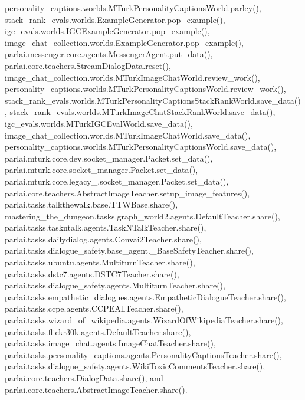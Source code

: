 personality\+\_\+captions.\+worlds.\+M\+Turk\+Personality\+Captions\+World.\+parley(), stack\+\_\+rank\+\_\+evals.\+worlds.\+Example\+Generator.\+pop\+\_\+example(), igc\+\_\+evals.\+worlds.\+I\+G\+C\+Example\+Generator.\+pop\+\_\+example(), image\+\_\+chat\+\_\+collection.\+worlds.\+Example\+Generator.\+pop\+\_\+example(), parlai.\+messenger.\+core.\+agents.\+Messenger\+Agent.\+put\+\_\+data(), parlai.\+core.\+teachers.\+Stream\+Dialog\+Data.\+reset(), image\+\_\+chat\+\_\+collection.\+worlds.\+M\+Turk\+Image\+Chat\+World.\+review\+\_\+work(), personality\+\_\+captions.\+worlds.\+M\+Turk\+Personality\+Captions\+World.\+review\+\_\+work(), stack\+\_\+rank\+\_\+evals.\+worlds.\+M\+Turk\+Personality\+Captions\+Stack\+Rank\+World.\+save\+\_\+data(), stack\+\_\+rank\+\_\+evals.\+worlds.\+M\+Turk\+Image\+Chat\+Stack\+Rank\+World.\+save\+\_\+data(), igc\+\_\+evals.\+worlds.\+M\+Turk\+I\+G\+C\+Eval\+World.\+save\+\_\+data(), image\+\_\+chat\+\_\+collection.\+worlds.\+M\+Turk\+Image\+Chat\+World.\+save\+\_\+data(), personality\+\_\+captions.\+worlds.\+M\+Turk\+Personality\+Captions\+World.\+save\+\_\+data(), parlai.\+mturk.\+core.\+dev.\+socket\+\_\+manager.\+Packet.\+set\+\_\+data(), parlai.\+mturk.\+core.\+socket\+\_\+manager.\+Packet.\+set\+\_\+data(), parlai.\+mturk.\+core.\+legacy\+\_.\+socket\+\_\+manager.\+Packet.\+set\+\_\+data(), parlai.\+core.\+teachers.\+Abstract\+Image\+Teacher.\+setup\+\_\+image\+\_\+features(), parlai.\+tasks.\+talkthewalk.\+base.\+T\+T\+W\+Base.\+share(), mastering\+\_\+the\+\_\+dungeon.\+tasks.\+graph\+\_\+world2.\+agents.\+Default\+Teacher.\+share(), parlai.\+tasks.\+taskntalk.\+agents.\+Task\+N\+Talk\+Teacher.\+share(), parlai.\+tasks.\+dailydialog.\+agents.\+Convai2\+Teacher.\+share(), parlai.\+tasks.\+dialogue\+\_\+safety.\+base\+\_\+agent.\+\_\+\+Base\+Safety\+Teacher.\+share(), parlai.\+tasks.\+ubuntu.\+agents.\+Multiturn\+Teacher.\+share(), parlai.\+tasks.\+dstc7.\+agents.\+D\+S\+T\+C7\+Teacher.\+share(), parlai.\+tasks.\+dialogue\+\_\+safety.\+agents.\+Multiturn\+Teacher.\+share(), parlai.\+tasks.\+empathetic\+\_\+dialogues.\+agents.\+Empathetic\+Dialogue\+Teacher.\+share(), parlai.\+tasks.\+ccpe.\+agents.\+C\+C\+P\+E\+All\+Teacher.\+share(), parlai.\+tasks.\+wizard\+\_\+of\+\_\+wikipedia.\+agents.\+Wizard\+Of\+Wikipedia\+Teacher.\+share(), parlai.\+tasks.\+flickr30k.\+agents.\+Default\+Teacher.\+share(), parlai.\+tasks.\+image\+\_\+chat.\+agents.\+Image\+Chat\+Teacher.\+share(), parlai.\+tasks.\+personality\+\_\+captions.\+agents.\+Personality\+Captions\+Teacher.\+share(), parlai.\+tasks.\+dialogue\+\_\+safety.\+agents.\+Wiki\+Toxic\+Comments\+Teacher.\+share(), parlai.\+core.\+teachers.\+Dialog\+Data.\+share(), and parlai.\+core.\+teachers.\+Abstract\+Image\+Teacher.\+share().

